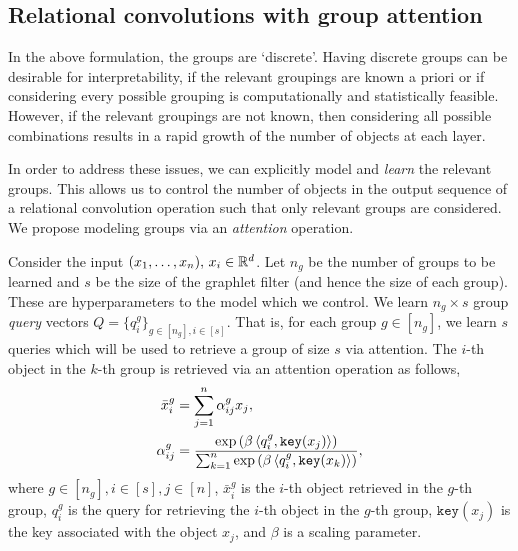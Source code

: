 \subsection{Relational convolutions with group attention}\label{ssec:relconv_groupattn}

In the above formulation, the groups are `discrete'. Having discrete groups can be desirable for interpretability, if the relevant groupings are known a priori or if considering every possible grouping is computationally and statistically feasible. However, if the relevant groupings are not known, then considering all possible combinations results in a rapid growth of the number of objects at each layer.

In order to address these issues, we can explicitly model and \textit{learn} the relevant groups. This allows us to control the number of objects in the output sequence of a relational convolution operation such that only relevant groups are considered. We propose modeling groups via an \textit{attention} operation.

Consider the input $(x_1, \ldots, x_n),\, x_i \in \mathbb{R}^d$. Let $n_g$ be the number of groups to be learned and $s$ be the size of the graphlet filter (and hence the size of each group). These are hyperparameters to the model which we control. We learn $n_g \times s$ group \textit{query} vectors $Q = \{q_{i}^{g}\}_{g \in [n_g], i \in [s]}$. That is, for each group $g \in [n_g]$, we learn $s$ queries which will be used to retrieve a group of size $s$ via attention. The $i$-th object in the $k$-th group is retrieved via an attention operation as follows,
\begin{equation}\label{eq:group_attn}
    \begin{aligned}
        \bar{x}_{i}^{g} &= \sum_{j = 1}^{n} \alpha_{ij}^{g} x_j,\\
        \alpha_{ij}^{g} &= \frac{\exp\left(\beta \left \langle q_i^g, \mathtt{key}(x_j) \right\rangle\right)}{\sum_{k = 1}^{n}{\exp\left(\beta \left \langle q_i^g, \mathtt{key}(x_k) \right\rangle\right)}},
    \end{aligned}
\end{equation}
where $g \in [n_g], i \in [s], j \in [n]$, $\bar{x}_{i}^{g}$ is the $i$-th object retrieved in the $g$-th group, $q_{i}^{g}$ is the query for retrieving the $i$-th object in the $g$-th group, $\mathtt{key}(x_j)$ is the key associated with the object $x_j$, and $\beta$ is a scaling parameter. %

